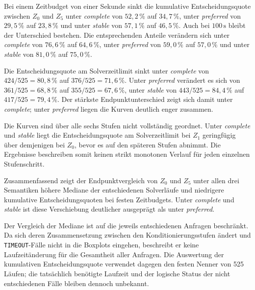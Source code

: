 Bei einem Zeitbudget von einer Sekunde sinkt die kumulative Entscheidungsquote zwischen
\(Z_0\) und \(Z_5\) unter \emph{complete} von \(52{,}2\,\%\) auf
\(34{,}7\,\%\), unter \emph{preferred} von \(29{,}5\,\%\) auf
\(23{,}8\,\%\) und unter \emph{stable} von \(57{,}1\,\%\) auf
\(46{,}5\,\%\). Auch bei \(100\,\mathrm{s}\) bleibt der Unterschied
bestehen. Die entsprechenden Anteile verändern sich unter
\emph{complete} von \(76{,}6\,\%\) auf \(64{,}6\,\%\), unter
\emph{preferred} von \(59{,}0\,\%\) auf \(57{,}0\,\%\) und unter
\emph{stable} von \(81{,}0\,\%\) auf \(75{,}0\,\%\).

Die Entscheidungsquote am Solverzeitlimit sinkt unter \emph{complete} von
\(424/525=80{,}8\,\%\) auf \(376/525=71{,}6\,\%\). Unter
\emph{preferred} verändert es sich von \(361/525=68{,}8\,\%\) auf
\(355/525=67{,}6\,\%\), unter \emph{stable} von
\(443/525=84{,}4\,\%\) auf \(417/525=79{,}4\,\%\). Der stärkste
Endpunktunterschied zeigt sich damit unter \emph{complete}; unter
\emph{preferred} liegen die Kurven deutlich enger zusammen.

Die Kurven sind über alle sechs Stufen nicht vollständig geordnet. Unter
\emph{complete} und \emph{stable} liegt die Entscheidungsquote am Solverzeitlimit bei \(Z_1\)
geringfügig über demjenigen bei \(Z_0\), bevor es auf den späteren Stufen
abnimmt. Die Ergebnisse beschreiben somit keinen strikt monotonen Verlauf
für jeden einzelnen Stufenschritt.

Zusammenfassend zeigt der Endpunktvergleich von \(Z_0\) und \(Z_5\) unter
allen drei Semantiken höhere Mediane der entschiedenen Solverläufe und
niedrigere kumulative Entscheidungsquoten bei festen Zeitbudgets. Unter
\emph{complete} und \emph{stable} ist diese Verschiebung deutlicher ausgeprägt
als unter \emph{preferred}.

Der Vergleich der Mediane ist auf die jeweils entschiedenen Anfragen beschränkt.
Da sich deren Zusammensetzung zwischen den Konditionierungsstufen ändert und
\texttt{TIMEOUT}-Fälle nicht in die Boxplots eingehen, beschreibt er keine
Laufzeitänderung für die Gesamtheit aller Anfragen. Die Auswertung der
kumulativen Entscheidungsquote verwendet dagegen den festen Nenner von 525
Läufen; die tatsächlich benötigte Laufzeit und
der logische Status der nicht entschiedenen Fälle bleiben dennoch unbekannt.
